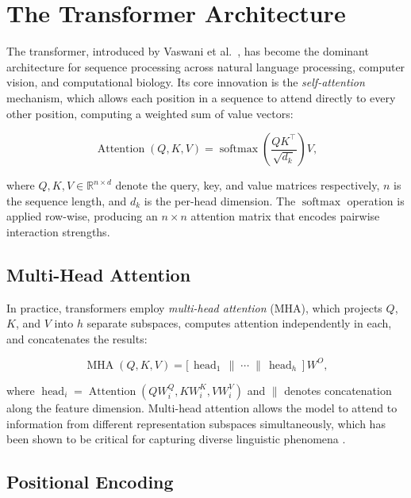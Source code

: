 \section{The Transformer Architecture}

The transformer, introduced by Vaswani et al.\ \cite{vaswani2017attention}, has become the
dominant architecture for sequence processing across natural language processing, computer
vision, and computational biology. Its core innovation is the \textit{self-attention}
mechanism, which allows each position in a sequence to attend directly to every other
position, computing a weighted sum of value vectors:

\begin{equation}
  \operatorname{Attention}(Q,K,V) = \operatorname{softmax}\!\left(
    \frac{QK^{\top}}{\sqrt{d_k}}
  \right) V ,
  \label{eq:attention}
\end{equation}

where $Q, K, V \in \mathbb{R}^{n \times d}$ denote the query, key, and value matrices
respectively, $n$ is the sequence length, and $d_k$ is the per-head dimension. The
$\operatorname{softmax}$ operation is applied row-wise, producing an $n \times n$ attention
matrix that encodes pairwise interaction strengths.

\subsection{Multi-Head Attention}

In practice, transformers employ \textit{multi-head attention} (MHA), which projects
$Q$, $K$, and $V$ into $h$ separate subspaces, computes attention independently in each,
and concatenates the results:

\begin{equation}
  \operatorname{MHA}(Q,K,V) = \bigl[\,\operatorname{head}_1 \,\|\; \cdots \;\|\,
    \operatorname{head}_h\,\bigr]\,W^{O},
  \label{eq:mha}
\end{equation}

where $\operatorname{head}_i = \operatorname{Attention}(QW_i^{Q}, KW_i^{K}, VW_i^{V})$ and
$\|$ denotes concatenation along the feature dimension. Multi-head attention allows the model
to attend to information from different representation subspaces simultaneously, which has
been shown to be critical for capturing diverse linguistic phenomena
\cite{voita2019analyzing}.

\subsection{Positional Encoding}

